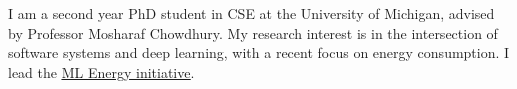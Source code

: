 

\begin{cvparagraph}

I am a second year PhD student in CSE at the University of Michigan, advised by Professor Mosharaf Chowdhury.
My research interest is in the intersection of software systems and deep learning, with a recent focus on energy consumption.
I lead the \href{https://ml.energy}{\underline{ML Energy initiative}}.
\end{cvparagraph}
